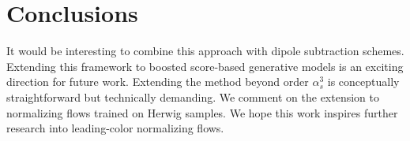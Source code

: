 \section{Conclusions}\label{sec:conclusions}

It would be interesting to combine this approach with dipole subtraction
schemes. Extending this framework to boosted score-based generative
models is an exciting direction for future work. Extending the method
beyond order $\alpha_s^3$ is conceptually straightforward but
technically demanding. We comment on the extension to normalizing flows
trained on Herwig samples. We hope this work inspires further research
into leading-color normalizing flows.

